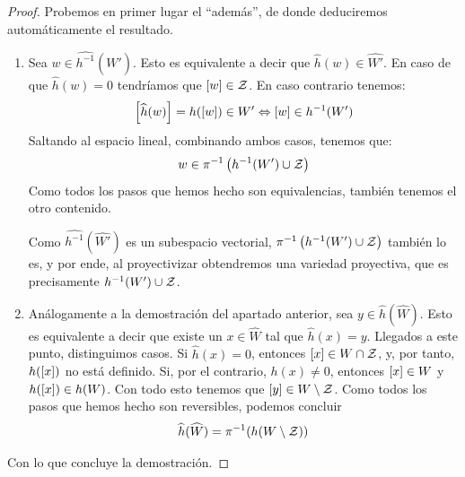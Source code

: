 \begin{proof}
	Probemos en primer lugar el ``además'', de donde deduciremos automáticamente el resultado.
	
	\begin{enumerate}
		\item[\ti{2.}] Sea $w\in \widehat{h^{-1}}(\widehat{W'})$. Esto es equivalente a decir que $\widehat{h}(w)\in\widehat{W'}$. En caso de que $\widehat{h}(w)=0$ tendríamos que $\left [ w \right ]\in\mathcal{Z}$. En caso contrario tenemos:
		\[\left [ \widehat{h}(w) \right ]=h(\left [ w \right ])\in W'\Leftrightarrow\left [ w \right ]\in h^{-1}(W')\]
		Saltando al espacio lineal, combinando ambos casos, tenemos que:
		\[w\in\pi^{-1}\left(h^{-1}(W')\cup\mathcal{Z}\right)\]
		Como todos los pasos que hemos hecho son equivalencias, también tenemos el otro contenido.
		
		Como $\widehat{h^{-1}}(\widehat{W'})$ es un subespacio vectorial, $\pi^{-1}\left(h^{-1}(W')\cup\mathcal{Z}\right)$ también lo es, y por ende, al proyectivizar obtendremos una variedad proyectiva, que es precisamente $h^{-1}(W')\cup\mathcal{Z}$.
		\item[\ti{1.}] Análogamente a la demostración del apartado anterior, sea $y\in\widehat{h}(\widehat{W})$. Esto es equivalente a decir que existe un $x\in\widehat{W}$ tal que $\widehat{h}(x)=y$. Llegados a este punto, distinguimos casos. Si $\widehat{h}(x)=0$, entonces $\left [ x \right ]\in W\cap\mathcal{Z}$, y, por tanto, $h(\left [ x \right ])$ no está definido. Si, por el contrario, $h(x)\not=0$, entonces $\left [ x \right ]\in W$ y $h(\left [ x \right ])\in h(W)$. Con todo esto tenemos que $\left [ y \right ]\in W\setminus\mathcal{Z}$. Como todos los pasos que hemos hecho son reversibles, podemos concluir
		\[\widehat{h}(\widehat{W})=\pi^{-1}(h(W\setminus\mathcal{Z}))\]
	\end{enumerate}
	Con lo que concluye la demostración.
\end{proof}

